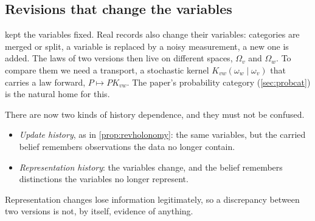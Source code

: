 \documentclass[11pt]{article}
\theoremstyle{definition}\newtheorem{definition}[theorem]{Definition}\newtheorem{remark}[theorem]{Remark}\newtheorem{example}[theorem]{Example}\newtheorem{problem}[theorem]{Open problem}\crefname{problem}{Problem}{Problems}
\begin{document}
\subsection{Revisions that change the variables}\label{sec:kerneltransport}
 kept the variables fixed. Real records also change their variables: categories are merged or split, a variable is replaced by a noisy measurement, a new one is added. The laws of two versions then live on different spaces, $\Omega_v$ and $\Omega_w$. To compare them we need a transport, a stochastic kernel $K_{vw}(\omega_w\mid\omega_v)$ that carries a law forward, $P\mapsto PK_{vw}$. The paper's probability category (\cref{sec:probcat}) is the natural home for this.

There are now two kinds of history dependence, and they must not be confused.
\begin{itemize}
\item \emph{Update history}, as in \cref{prop:revholonomy}: the same variables, but the carried belief remembers observations the data no longer contain.
\item \emph{Representation history}: the variables change, and the belief remembers distinctions the variables no longer represent.
\end{itemize}
Representation changes lose information legitimately, so a discrepancy between two versions is not, by itself, evidence of anything.
\end{document}
